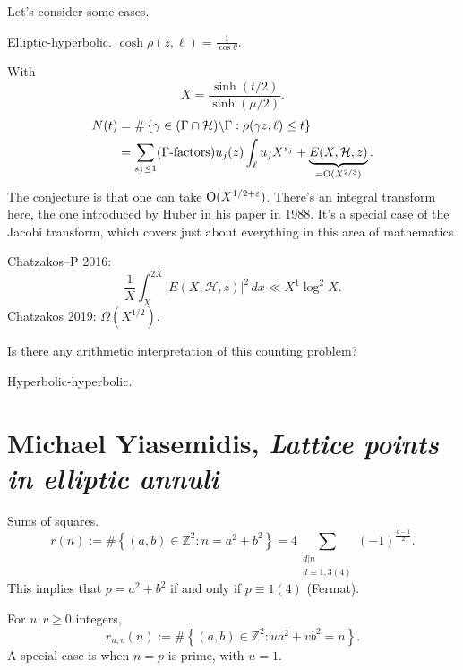 \documentclass[reqno]{amsart} 
\begin{document}
Let's consider some cases.

Elliptic-hyperbolic.  $\cosh \rho (z, \ell ) = \frac{1}{ \cos \theta }$.

With
\begin{equation*}
X = \frac{\sinh (t / 2)}{ \sinh (\mu / 2)}.
\end{equation*}
\begin{align*}
  N(t)
  &= \# \left\{ \gamma \in (\Gamma \cap \mathcal{H} ) \backslash \Gamma
    : \rho (\gamma z, \ell ) \leq t
  \right\} \\
  &=
  \sum_{s_j \leq 1}
  (\Gamma\text{-factors})
    u_j (z) \int_{\ell} u_j X^{s_j }+
    \underbrace
{
E (X, \mathcal{H}, z)
}_{
= \operatorname{O}(X^{2/3}  )
}.
\end{align*}
The conjecture is that one can take $\operatorname{O}(X^{1/2 + \varepsilon })$.  There's an integral transform here, the one introduced by Huber in his paper in 1988.  It's a special case of the Jacobi transform, which covers just about everything in this area of mathematics.

Chatzakos--P 2016:
\begin{equation*}
  \frac{1}{X} \int_X^{2 X }
  \lvert E (X, \mathcal{H}, z) \rvert^2 \, d x \ll X^1 \log^2 X.
\end{equation*}
Chatzakos 2019: $\Omega (X^{1/2} )$.

Is there any arithmetic interpretation of this counting problem?

Hyperbolic-hyperbolic.

\section{Michael Yiasemidis, \emph{Lattice points in elliptic annuli}}

Sums of squares.
\begin{equation*}
  r (n ) := \# \left\{ (a, b ) \in \mathbb{Z}^2  : n = a^2 + b^2  \right\}
  = 4 \sum_{
    \substack{
      d | n  \\
      d \equiv 1, 3 (4)
    }
  }
  (-1)^{\frac{d - 1}{2}}.
\end{equation*}
This implies that $p = a^2 + b^2$ if and only if $p \equiv 1(4)$ (Fermat).

For $u, v \geq 0$ integers,
\begin{equation*}
  r_{u, v} (n) := \# \left\{ (a, b) \in \mathbb{Z}^2 : u a^2 + v b^2 = n \right\}.
\end{equation*}
A special case is when $n =p$ is prime, with $u = 1$.
\end{document}
